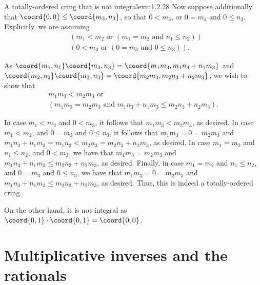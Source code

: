 \begin{exm}{A totally-ordered cring that is not integral}{exm1.2.28}
Now suppose additionally that $\coord{0,0}\leq \coord{m_3,n_3}$, so that $0<m_3$, or $0=m_3$ and $0\leq n_3$.  Explicitly, we are assuming
\begin{equation}
\begin{aligned}
&\left( m_1<m_2\text{ or }\left( m_1=m_2\text{ and }n_1\leq n_2\right) \right) \\ &\left( 0<m_3\text{ or }\left( 0=m_3\text{ and }0\leq n_3\right) \right) .
\end{aligned}
\end{equation}

As $\coord{m_1,n_1}\coord{m_3,n_3}=\coord{m_1m_3,m_1n_3+n_1m_3}$ and $\coord{m_2,n_2}\coord{m_3,n_3}=\coord{m_2m_3,m_2n_3+n_2m_3}$, we wish to show that
\begin{equation*}
\begin{multlined}
m_1m_3<m_2m_3\text{ or } \\ \left( m_1m_3=m_2m_3\text{ and }m_1n_3+n_1m_3\leq m_2n_3+n_2m_3\right) .
\end{multlined}
\end{equation*}

In case $m_1<m_2$ and $0<m_3$, it follows that $m_1m_3<m_2m_3$, as desired.  In case $m_1<m_2$, and $0=m_3$ and $0\leq n_3$, it follows that $m_1m_3=0=m_2m_3$ and $m_1n_3+n_1m_3=m_1n_3<m_2n_3=m_2n_3+n_2m_3$, as desired.  In case $m_1=m_2$ and $n_1\leq n_2$, and $0<m_3$, we have that $m_1m_3=m_2m_3$ and $m_1n_3+n_1m_3\leq m_2n_3+n_2m_3$, as desired.  Finally, in case $m_1=m_2$ and $n_1\leq n_2$, and $0=m_3$ and $0\leq n_3$, we have that $m_1m_3=0=m_2m_3$ and $m_1n_3+n_1m_3\leq m_2n_3+n_2m_3$, as desired.  Thus, this is indeed a totally-ordered cring.

On the other hand, it is not integral as $\coord{0,1}\cdot \coord{0,1}=\coord{0,0}$.
\end{exm}

\section{Multiplicative inverses and the rationals}

